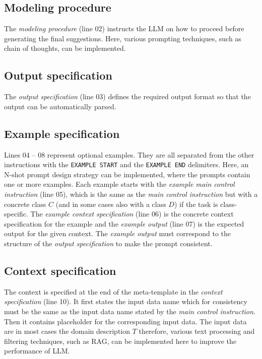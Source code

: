 \subsection{Modeling procedure}

The \textit{modeling procedure} (line 02) instructs the LLM on how to proceed before generating the final suggestions. Here, various prompting techniques, such as chain of thoughts, can be implemented.


\subsection{Output specification}

The \textit{output specification} (line 03) defines the required output format so that the output can be automatically parsed.


\subsection{Example specification}

Lines 04 -- 08 represent optional examples. They are all separated from the other instructions with the \texttt{EXAMPLE START} and the \texttt{EXAMPLE END} delimiters. Here, an N-shot prompt design strategy can be implemented, where the prompts contain one or more examples. Each example starts with the \emph{example main control instruction} (line 05), which is the same as the \emph{main control instruction} but with a concrete class $C$ (and in some cases also with a class $D$) if the task is class-specific. The \emph{example context specification} (line 06) is the concrete context specification for the example and the \emph{example output} (line 07) is the expected output for the given context. The \emph{example output} must correspond to the structure of the \emph{output specification} to make the prompt consistent.


\subsection{Context specification}

The context is specified at the end of the meta-template in the \emph{context specification} (line 10). It first states the input data name which for consistency must be the same as the input data name stated by the \emph{main control instruction}. Then it contains placeholder for the corresponding input data. The input data are in most cases the domain description $T$ therefore, various text processing and filtering techniques, such as RAG, can be implemented here to improve the performance of LLM.